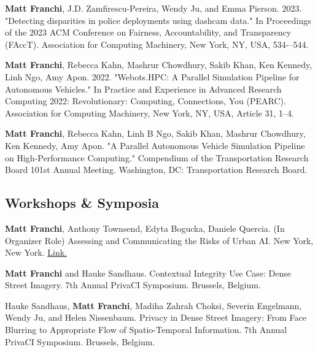 \documentclass[10pt,letterpaper]{report}
\begin{document}
\begin{tablist}

        \item[\rule{2em}{0.4pt}]
        
        \item[2023.a] \tab{}\textbf{Matt Franchi}, J.D. Zamfirescu-Pereira, Wendy Ju, and Emma Pierson. 2023. "Detecting disparities in police deployments using dashcam data." In Proceedings of the 2023 ACM Conference on Fairness, Accountability, and Transparency (FAccT). Association for Computing Machinery, New York, NY, USA, 534-–544. 

        \item[\rule{2em}{0.4pt}]

        \item[2022.b] \tab{}\textbf{Matt Franchi}, Rebecca Kahn, Mashrur Chowdhury, Sakib Khan, Ken Kennedy, Linh Ngo, Amy Apon. 2022. "Webots.HPC: A Parallel Simulation Pipeline for Autonomous Vehicles." In Practice and Experience in Advanced Research Computing 2022: Revolutionary: Computing, Connections, You (PEARC). Association for Computing Machinery, New York, NY, USA, Article 31, 1–4.

        \item[2022.a] \tab{}\textbf{Matt Franchi}, Rebecca Kahn, Linh B Ngo, Sakib Khan, Mashrur Chowdhury, Ken Kennedy, Amy Apon. "A Parallel Autonomous Vehicle Simulation Pipeline on High-Performance Computing." Compendium of the Transportation Research Board 101st Annual Meeting. Washington, DC: Transportation Research Board. 

    \end{tablist}

    \subsection*{Workshops \& Symposia}
    \begin{tablist}
        \item[2025.c] \tab{}\textbf{Matt Franchi}, Anthony Townsend, Edyta Bogucka, Daniele Quercia. (In Organizer Role) Assessing and Communicating the Risks of Urban AI. New York, New York. \href{https://luma.com/vrwpgt02}{Link.}
        \item[2025.b] \tab{}\textbf{Matt Franchi} and Hauke Sandhaus. Contextual Integrity Use Case: Dense Street Imagery. 7th Annual PrivaCI Symposium. Brussels, Belgium. 
        \item[2025.a] \tab{}Hauke Sandhaus, \textbf{Matt Franchi}, Madiha Zahrah Choksi, Severin Engelmann, Wendy Ju, and Helen Nissenbaum. Privacy in Dense Street Imagery: From Face Blurring to Appropriate Flow of Spatio-Temporal Information. 7th Annual PrivaCI Symposium. Brussels, Belgium.
    \end{tablist}
\end{document}
